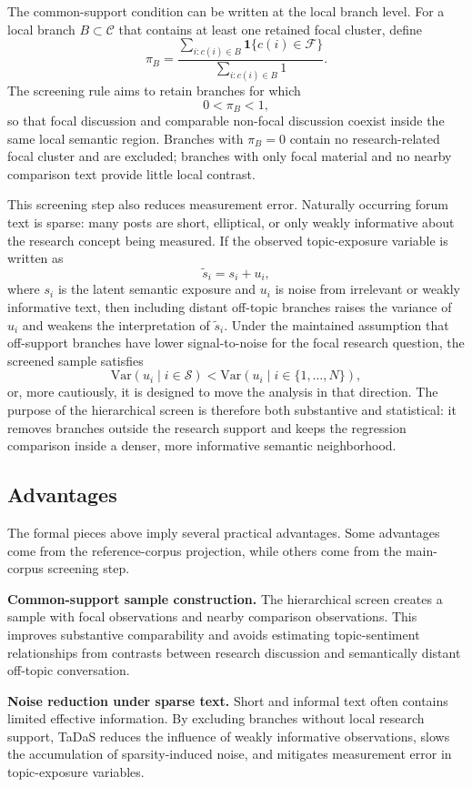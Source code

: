 \documentclass[11pt]{article}
\begin{document}
The common-support condition can be written at the local branch level. For a local branch $B\subset\mathcal{C}$ that contains at least one retained focal cluster, define
\[
\pi_B
=
\frac{\sum_{i:c(i)\in B}\mathbf{1}\{c(i)\in\mathcal{F}\}}
{\sum_{i:c(i)\in B}1}.
\]
The screening rule aims to retain branches for which
\[
0<\pi_B<1,
\]
so that focal discussion and comparable non-focal discussion coexist inside the same local semantic region. Branches with $\pi_B=0$ contain no research-related focal cluster and are excluded; branches with only focal material and no nearby comparison text provide little local contrast.

This screening step also reduces measurement error. Naturally occurring forum text is sparse: many posts are short, elliptical, or only weakly informative about the research concept being measured. If the observed topic-exposure variable is written as
\[
\widetilde{s}_i=s_i+u_i,
\]
where $s_i$ is the latent semantic exposure and $u_i$ is noise from irrelevant or weakly informative text, then including distant off-topic branches raises the variance of $u_i$ and weakens the interpretation of $\widetilde{s}_i$. Under the maintained assumption that off-support branches have lower signal-to-noise for the focal research question, the screened sample satisfies
\[
\mathrm{Var}(u_i\mid i\in\mathcal{S})
<
\mathrm{Var}(u_i\mid i\in\{1,\dots,N\}),
\]
or, more cautiously, it is designed to move the analysis in that direction. The purpose of the hierarchical screen is therefore both substantive and statistical: it removes branches outside the research support and keeps the regression comparison inside a denser, more informative semantic neighborhood.

\subsection{Advantages}

The formal pieces above imply several practical advantages. Some advantages come from the reference-corpus projection, while others come from the main-corpus screening step.

\textbf{Common-support sample construction.} The hierarchical screen creates a sample with focal observations and nearby comparison observations. This improves substantive comparability and avoids estimating topic-sentiment relationships from contrasts between research discussion and semantically distant off-topic conversation.

\textbf{Noise reduction under sparse text.} Short and informal text often contains limited effective information. By excluding branches without local research support, TaDaS reduces the influence of weakly informative observations, slows the accumulation of sparsity-induced noise, and mitigates measurement error in topic-exposure variables.
\end{document}
